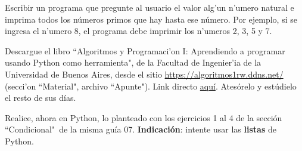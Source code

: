 \documentclass[11pt]{exam}
\begin{document}
\begin{questions}
\item Escribir un programa que pregunte al usuario el valor alg'un n'umero natural e imprima todos los números primos que hay hasta ese número. Por ejemplo, si se ingresa el n'umero 8, el programa debe imprimir los n'umeros 2, 3, 5 y 7.


\item Descargue el libro ``Algoritmos y Programaci'on I: Aprendiendo a programar usando Python como herramienta", de la Facultad de Ingenier'ia de la Universidad de Buenos Aires, desde el sitio \url{https://algoritmos1rw.ddns.net/} (secci'on ``Material", archivo ``Apunte"). Link directo \href{https://drive.google.com/file/d/0B0KKEIBDHL7tdEQ3bFZ2M3VrZzA/view}{aqu\'i}. Atesórelo y estúdielo el resto de sus días.

\item Realice, ahora en Python, lo planteado con los ejercicios 1 al 4 de la sección ``Condicional"\, de la misma guía 07. \textbf{Indicación}: intente usar las \textbf{listas} de Python.

\end{questions}
\end{document}
